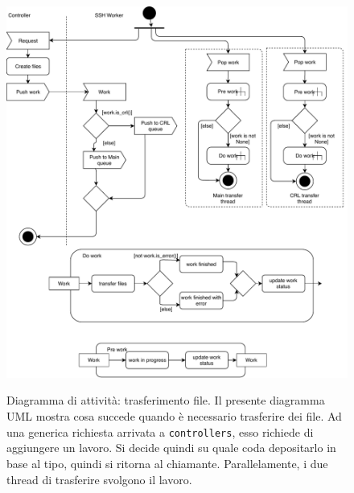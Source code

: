 \inputminted[tabsize=4, breaklines]{lua}{code_samples/works.lua}

\begin{figure}
	\includegraphics[scale=0.5]{img/activity_generic_file_transfer}
	\label{fig:activity-generic-file-transfer}
	\caption[Diagramma di attività: trasferimento file]{Diagramma di attività:
	trasferimento file. Il presente diagramma UML mostra cosa succede quando è necessario
	trasferire dei file. Ad una generica richiesta arrivata a \texttt{controllers},
	esso richiede di aggiungere un lavoro. Si decide quindi su quale coda
	depositarlo in base al tipo, quindi si ritorna al chiamante.
	Parallelamente, i due thread di trasferire svolgono il lavoro.}
\end{figure}


